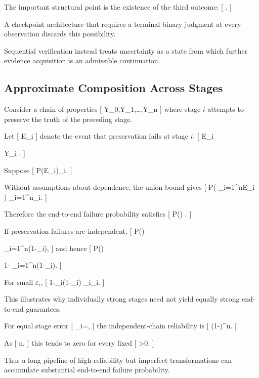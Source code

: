 \documentclass[11pt]{article}
\begin{document}
The important structural point is the existence of the third outcome:
[
.
]

A checkpoint architecture that requires a terminal binary judgment at every observation discards this possibility.

Sequential verification instead treats uncertainty as a state from which further evidence acquisition is an admissible continuation.

\subsection{Approximate Composition Across Stages}

Consider a chain of properties
[
Y_0,Y_1,\ldots,Y_n
]
where stage $i$ attempts to preserve the truth of the preceding stage.

Let
[
E_i
]
denote the event that preservation fails at stage $i$:
[
E_i

{
Y_i
}.
]

Suppose
[
P(E_i)\leq\varepsilon_i.
]

Without assumptions about dependence, the union bound gives
[
P\left(
\bigcup_{i=1}^{n}E_i
\right)
\leq
\sum_{i=1}^{n}\varepsilon_i.
]

Therefore the end-to-end failure probability satisfies
[
P()
\leq
\min
{}.
]

If preservation failures are independent,
[
P()

\prod_{i=1}^{n}(1-\varepsilon_i),
]
and hence
[
P()

1-
\prod_{i=1}^{n}(1-\varepsilon_i).
]

For small $\varepsilon_i$,
[
1-\prod_i(1-\varepsilon_i)
\approx
\sum_i\varepsilon_i.
]

This illustrates why individually strong stages need not yield equally strong end-to-end guarantees.

For equal stage error
[
\varepsilon_i=\varepsilon,
]
the independent-chain reliability is
[
(1-\varepsilon)^n.
]

As
[
n\to\infty,
]
this tends to zero for every fixed
[
\varepsilon>0.
]

Thus a long pipeline of high-reliability but imperfect transformations can accumulate substantial end-to-end failure probability.
\end{document}
